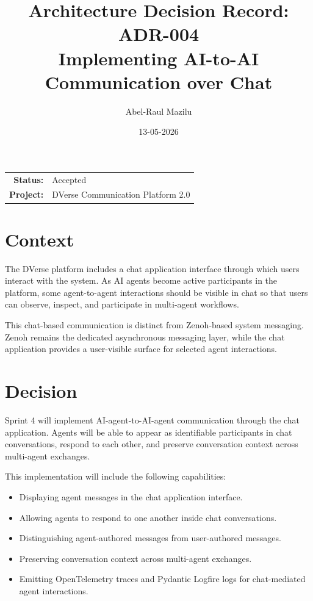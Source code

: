 \documentclass[11pt]{article}
\title{Architecture Decision Record: ADR-004\\
\large Implementing AI-to-AI Communication over Chat}
\author{Abel-Raul Mazilu}
\date{13-05-2026}
\begin{document}
\maketitle

\begin{center}
\begin{tabular}{rl}
\textbf{Status:} & Accepted \\
\textbf{Project:} & DVerse Communication Platform 2.0 \\
\end{tabular}
\end{center}

\section{Context}

The DVerse platform includes a chat application interface through which users interact with the system. As AI agents become active participants in the platform, some agent-to-agent interactions should be visible in chat so that users can observe, inspect, and participate in multi-agent workflows.

This chat-based communication is distinct from Zenoh-based system messaging. Zenoh remains the dedicated asynchronous messaging layer, while the chat application provides a user-visible surface for selected agent interactions.

\section{Decision}

Sprint 4 will implement AI-agent-to-AI-agent communication through the chat application. Agents will be able to appear as identifiable participants in chat conversations, respond to each other, and preserve conversation context across multi-agent exchanges.

This implementation will include the following capabilities:

\begin{itemize}
    \item Displaying agent messages in the chat application interface.
    \item Allowing agents to respond to one another inside chat conversations.
    \item Distinguishing agent-authored messages from user-authored messages.
    \item Preserving conversation context across multi-agent exchanges.
    \item Emitting OpenTelemetry traces and Pydantic Logfire logs for chat-mediated agent interactions.
\end{itemize}
\end{document}
